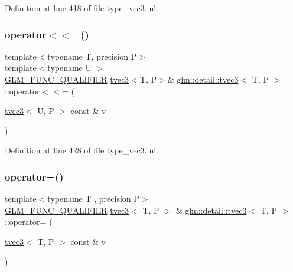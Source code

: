 Definition at line 418 of file type\+\_\+vec3.\+inl.

\mbox{\label{structglm_1_1detail_1_1tvec3_aabbf88378ef21973abac8cdacd0b4117}} 
\subsubsection{\texorpdfstring{operator$<$$<$=()}{operator<<=()}\hspace{0.1cm}{\footnotesize\ttfamily [4/4]}}
{\footnotesize\ttfamily template$<$typename T, precision P$>$ \\
template$<$typename U $>$ \\
\hyperlink{setup_8hpp_a33fdea6f91c5f834105f7415e2a64407}{G\+L\+M\+\_\+\+F\+U\+N\+C\+\_\+\+Q\+U\+A\+L\+I\+F\+I\+ER} \hyperlink{structglm_1_1detail_1_1tvec3}{tvec3}$<$T, P$>$\& \hyperlink{structglm_1_1detail_1_1tvec3}{glm\+::detail\+::tvec3}$<$ T, P $>$\+::operator$<$$<$= (\begin{DoxyParamCaption}\item[{\hyperlink{structglm_1_1detail_1_1tvec3}{tvec3}$<$ U, P $>$ const \&}]{v }\end{DoxyParamCaption})}



Definition at line 428 of file type\+\_\+vec3.\+inl.

\mbox{\label{structglm_1_1detail_1_1tvec3_a9f44bd2cac6579b51eab334829af1421}} 
\subsubsection{\texorpdfstring{operator=()}{operator=()}\hspace{0.1cm}{\footnotesize\ttfamily [1/3]}}
{\footnotesize\ttfamily template$<$typename T , precision P$>$ \\
\hyperlink{setup_8hpp_a33fdea6f91c5f834105f7415e2a64407}{G\+L\+M\+\_\+\+F\+U\+N\+C\+\_\+\+Q\+U\+A\+L\+I\+F\+I\+ER} \hyperlink{structglm_1_1detail_1_1tvec3}{tvec3}$<$ T, P $>$ \& \hyperlink{structglm_1_1detail_1_1tvec3}{glm\+::detail\+::tvec3}$<$ T, P $>$\+::operator= (\begin{DoxyParamCaption}\item[{\hyperlink{structglm_1_1detail_1_1tvec3}{tvec3}$<$ T, P $>$ const \&}]{v }\end{DoxyParamCaption})}



